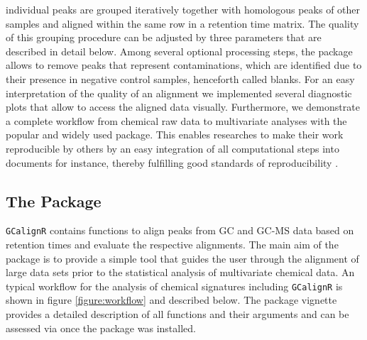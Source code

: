 individual peaks are grouped iteratively together with homologous peaks
of other samples and aligned within the same row in a retention time
matrix. The quality of this grouping procedure can be adjusted by three
parameters that are described in detail below. Among several optional
processing steps, the package allows to remove peaks that represent
contaminations, which are identified due to their presence in negative
control samples, henceforth called blanks. For an easy interpretation of
the quality of an alignment we implemented several diagnostic plots that
allow to access the aligned data visually. Furthermore, we demonstrate a
complete workflow from chemical raw data to multivariate analyses with
the popular and widely used
\href{https://cran.r-project.org/web/packages/vegan/index.html}{}
\citep{Oksanen.2016} package. This enables researches to make their work
reproducible by others by an easy integration of all computational steps
into  documents \citep{Allaire.2016} for instance,
thereby fulfilling good standards of reproducibility \citep{Peng.2011}.

\subsection{The Package}\label{the-package}

\texttt{GCalignR} contains functions to align peaks from GC and GC-MS
data based on retention times and evaluate the respective alignments.
The main aim of the package is to provide a simple tool that guides the
user through the alignment of large data sets prior to the statistical
analysis of multivariate chemical data. An typical workflow for the
analysis of chemical signatures including \texttt{GCalignR} is shown in
figure \ref{figure:workflow} and described below. The package vignette
provides a detailed description of all functions and their arguments and
can be assessed via  once the package
was installed.

